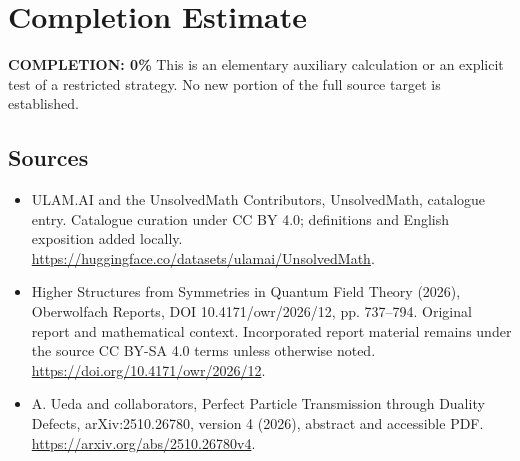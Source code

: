 \documentclass[11pt]{article}
\begin{document}
\section{Completion Estimate}
\noindent\textbf{COMPLETION: 0\%}
This is an elementary auxiliary calculation or an explicit test of a restricted strategy. No new portion of the full source target is established.

\subsection{Sources}
\begin{itemize}
\item[\hypertarget{source:statement:1}{S1}] ULAM.AI and the UnsolvedMath Contributors, UnsolvedMath, catalogue entry. Catalogue curation under CC BY 4.0; definitions and English exposition added locally.
\url{https://huggingface.co/datasets/ulamai/UnsolvedMath}.
\item[\hypertarget{source:statement:2}{S2}] Higher Structures from Symmetries in Quantum Field Theory (2026), Oberwolfach Reports, DOI 10.4171/owr/2026/12, pp. 737--794. Original report and mathematical context. Incorporated report material remains under the source CC BY-SA 4.0 terms unless otherwise noted.
\url{https://doi.org/10.4171/owr/2026/12}.
\end{itemize}
\label{end:statement}

\begin{itemize}
\item[\hypertarget{source:statement:E1}{E1}] A. Ueda and collaborators, Perfect Particle Transmission through Duality Defects, arXiv:2510.26780, version 4 (2026), abstract and accessible PDF.
\url{https://arxiv.org/abs/2510.26780v4}.
\end{itemize}
\end{document}
